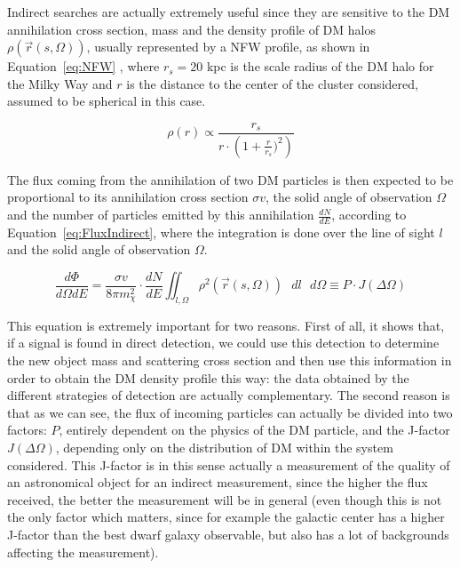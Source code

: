 \documentclass[a4paper, 10pt, openright]{report}
\begin{document}
Indirect searches are actually extremely useful since they are sensitive to the \ac{DM} annihilation cross section, mass and the density profile of \ac{DM} halos $\rho(\overrightarrow{r}(s, \Omega))$, usually represented by a \ac{NFW} profile, as shown in Equation~\ref{eq:NFW} \cite{FluxIndirect}, where $r_s = 20$ kpc is the scale radius of the \ac{DM} halo for the Milky Way and $r$ is the distance to the center of the cluster considered, assumed to be spherical in this case.

\begin{equation}
\label{eq:NFW}
\rho(r) \propto \frac{r_s}{r \cdot \left (1+\frac{r}{r_s})^2 \right )}
\end{equation} 

The flux coming from the annihilation of two \ac{DM} particles is then expected to be proportional to its annihilation cross section $\sigma v$, the solid angle of observation $\Omega$ and the number of particles emitted by this annihilation $\frac{dN}{dE}$, according to Equation~\ref{eq:FluxIndirect}, where the integration is done over the line of sight $l$ and the solid angle of observation $\Omega$.

\begin{equation}
\label{eq:FluxIndirect}
\frac{d \Phi}{d\Omega dE} = \frac{\sigma v}{8 \pi m_\chi^2} \cdot \frac{dN}{dE} \iint_{l, \Omega} \rho^2(\overrightarrow{r}(s, \Omega)) \text{ } dl \text{ } d\Omega \equiv P \cdot J(\Delta \Omega)
\end{equation} 

This equation is extremely important for two reasons. First of all, it shows that, if a signal is found in direct detection, we could use this detection to determine the new object mass and scattering cross section and then use this information in order to obtain the \ac{DM} density profile this way: the data obtained by the different strategies of detection are actually complementary. The second reason is that as we can see, the flux of incoming particles can actually be divided into two factors: $P$, entirely dependent on the physics of the \ac{DM} particle, and the J-factor $J(\Delta \Omega)$, depending only on the distribution of \ac{DM} within the system considered. This J-factor is in this sense actually a measurement of the quality of an astronomical object for an indirect measurement, since the higher the flux received, the better the measurement will be in general (even though this is not the only factor which matters, since for example the galactic center has a higher J-factor than the best dwarf galaxy observable, but also has a lot of backgrounds affecting the measurement).
\end{document}
